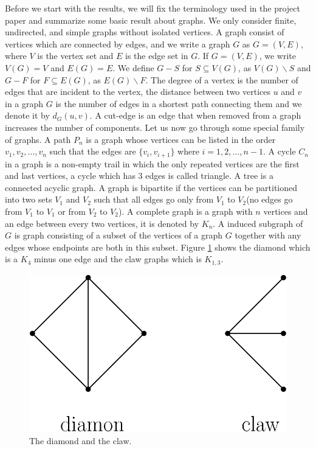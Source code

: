 \documentclass[12pt,a4paper,titlepage,openany]{report}
\begin{document}
Before we start with the results, we will fix the terminology used in the project paper and summarize some basic result about graphs. We only consider finite, undirected, and simple graphs without isolated vertices. A graph consist of vertices which are connected by edges, and we write a graph $G$ as $G=(V,E)$, where $V$ is the vertex set and $E$ is the edge set in $G$. If $G=(V,E)$, we write $V(G)=V$ and $E(G)=E$. We define $G-S$ for $S\subseteq V(G)$, as $V(G)\backslash S$ and $G-F$ for $F\subseteq E(G)$, as $E(G)\backslash F$. The degree of a vertex is the number of edges that are incident to the vertex, the distance between two vertices $u$ and $v$ in a graph $G$ is the number of edges in a shortest path connecting them and we denote it by $d_G(u,v)$. A cut-edge is an edge that when removed from a graph increases the number of components. Let us now go through some special family of graphs. A path $P_n$ is a graph whose vertices can be listed in the order $v_1, v_2,\ldots, v_n$ such that the edges are $\{v_i, v_{i+1}\}$ where $i = 1, 2,\ldots , n − 1$. A cycle $C_n$ in a graph is a non-empty trail in which the only repeated vertices are the first and last vertices, a cycle which has 3 edges is called triangle. A tree is a connected acyclic graph. A graph is bipartite if the vertices can be partitioned into two sets $V_1$ and $V_2$ such that all edges go only from $V_1$ to $V_2$(no edges go from $V_1$ to $V_1$ or from $V_2$ to $V_2$). A complete graph is a graph with $n$ vertices and an edge between every two vertices, it is denoted by $K_n$. A induced subgraph of $G$ is graph consisting of a subset of the vertices of a graph $G$ together with any edges whose endpoints are both in this subset. Figure \ref{diaclaw} shows the diamond which is a $K_4$ minus one edge and the claw graphs which is $K_{1,3}$.

\begin{figure}[h]
\begin{center}
\includegraphics[width=0.5\linewidth]{figures/diaclaw.png}
\end{center}
\caption{The diamond and the claw.}\label{diaclaw}
\end{figure}
\end{document}
